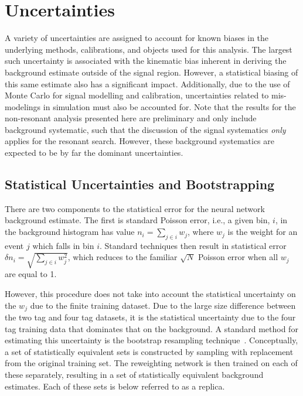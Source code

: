 


\FloatBarrier
\clearpage
\section{Uncertainties}
\label{sec:systematics}
A variety of uncertainties are assigned to account for known biases in the
underlying methods, calibrations, and objects used for this analysis. The
largest such uncertainty is associated with the kinematic bias inherent in
deriving the background estimate outside of the signal region. However, a
statistical biasing of this same estimate also has a significant impact.
Additionally, due to the use of Monte Carlo for signal modelling and \btag
calibration, uncertainties related to mis-modelings in simulation must also be
accounted for. Note that the results for the non-resonant analysis presented here are 
preliminary and only include background systematic, such that the discussion of the 
signal systematics \emph{only} applies for the resonant search. However, these background 
systematics are expected to be by far the dominant uncertainties.

\subsection{Statistical Uncertainties and Bootstrapping}
There are two components to the statistical error for the neural network
background estimate. The first is standard Poisson error, i.e., a given bin,
$i$, in the background histogram has value $n_i = \sum\limits_{j\in i} w_j$,
where $w_j$ is the weight for an event $j$ which falls in bin $i$. Standard
techniques then result in statistical error $\delta n_i =
	\sqrt{\sum\limits_{j\in i} w_j^2}$, which reduces to the familiar $\sqrt{N}$
Poisson error when all $w_j$ are equal to 1.

However, this procedure does not take into account the statistical uncertainty
on the $w_j$ due to the finite training dataset. Due to the large size
difference between the two tag and four tag datasets, it is the statistical
uncertainty due to the four tag training data that dominates that on the
background. A standard method for estimating this uncertainty is the bootstrap
resampling technique~\cite{Bootstrap}. Conceptually, a set of statistically
equivalent sets is constructed by sampling with replacement from the original
training set. The reweighting network is then trained on each of these
separately, resulting in a set of statistically equivalent background estimates.
Each of these sets is below referred to as a replica.

